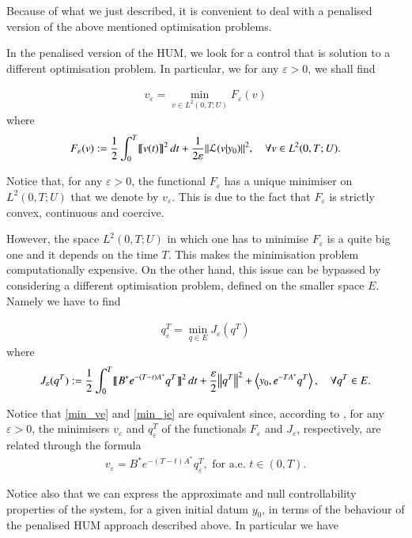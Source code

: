 Because of what we just described, it is convenient to deal with a penalised version of the above mentioned optimisation problems.

In the penalised version of the HUM, we look for a control that is solution to a different optimisation problem. In particular, we for any $\varepsilon>0$, we shall find

\begin{align}\label{min_ve}
	v_\varepsilon=\min_{v\in L^2(0,T;U)} F_\varepsilon (v)
\end{align}
where
\begin{align*}
	F_\varepsilon(v):=\frac{1}{2}\int_0^T\llbracket v(t)\rrbracket^2\,dt+\frac{1}{2\varepsilon}{\left\|\mathcal L(v|y_0)\right\|}_{}^2, \quad \forall v\in L^2(0,T;U).
\end{align*}

Notice that, for any $\varepsilon > 0$, the functional $F_\varepsilon$ has a unique minimiser on $L^2(0,T;U)$  that we denote by $v_\varepsilon$. This is due to the fact that $F_\varepsilon$ is strictly convex, continuous and coercive. 

However, the space $L^2(0,T;U)$ in which one has to minimise $F_\varepsilon$ is a quite big one and it depends on the time $T$. This makes the minimisation problem computationally expensive. On the other hand, this issue can be bypassed by considering a different optimisation problem, defined on the smaller space $E$. Namely we have to find  

\begin{align}\label{min_je}
	q^T_\varepsilon=\min_{q\in E} J_\varepsilon (q^T)
\end{align}
where
\begin{align*}
	J_\varepsilon(q^T):=\frac{1}{2}\int_0^T\llbracket B^*e^{-(T-t)A^*}q^T\rrbracket^2\,dt+\frac{\varepsilon}{2}{\left\|q^T\right\|}_{}^2 + \left\langle y_0,e^{-TA^*}q^T\right\rangle, \quad \forall q^T\in E.
\end{align*}

Notice that \eqref{min_ve} and \eqref{min_je} are equivalent since, according to \cite[Proposition 1.5]{boyer2013penalised}, for any $\varepsilon > 0$, the minimisers $v_\varepsilon$ and $q_\varepsilon^T$ of the functionals $F_\varepsilon$ and $J_\varepsilon$, respectively, are related through the formula
\begin{align*}
	v_\varepsilon = B^*e^{-(T-t)A^*}q_\varepsilon^T, \textrm{ for a.e. } t\in(0,T).
\end{align*} 

Notice also that we can express the approximate and null controllability properties of the system, for a given initial datum $y_0$, in terms of the behaviour of the penalised HUM approach described above. In particular we have 

